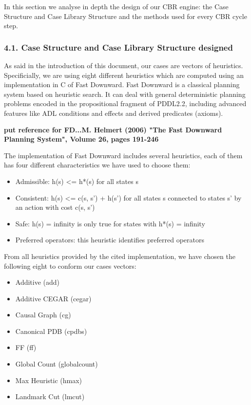 \documentclass[11pt]{article}
\begin{document}
In this section we analyse in depth the design of our CBR engine: the
Case Structure and Case Library Structure and the methods used for every
CBR cycle step.

\subsubsection{4.1. Case Structure and Case Library Structure
designed}\label{case-structure-and-case-library-structure-designed}

As said in the introduction of this document, our cases are vectors of
heuristics. Specificially, we are using eight different heuristics which
are computed using an implementation in C of Fast Downward. Fast
Downward is a classical planning system based on heuristic search. It
can deal with general deterministic planning problems encoded in the
propositional fragment of PDDL2.2, including advanced features like ADL
conditions and effects and derived predicates (axioms).

\textbf{put reference for FD...M. Helmert (2006) "The Fast Downward
Planning System", Volume 26, pages 191-246}

The implementation of Fast Downward includes several heuristics, each of
them has four different characteristics we have used to choose them:

\begin{itemize}
\item
  Admissible: h(s) \textless{}= h*(s) for all states s
\item
  Consistent: h(s) \textless{}= c(s, s') + h(s') for all states s
  connected to states s' by an action with cost c(s, s')
\item
  Safe: h(s) = infinity is only true for states with h*(s) = infinity
\item
  Preferred operators: this heuristic identifies preferred operators
\end{itemize}

From all heuristics provided by the cited implementation, we have chosen
the following eight to conform our cases vectors:

\begin{itemize}
\item
  Additive (add)
\item
  Additive CEGAR (cegar)
\item
  Causal Graph (cg)
\item
  Canonical PDB (cpdbs)
\item
  FF (ff)
\item
  Global Count (globalcount)
\item
  Max Heuristic (hmax)
\item
  Landmark Cut (lmcut)
\end{itemize}
\end{document}
